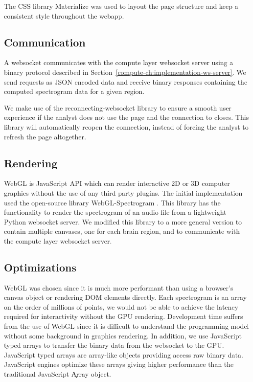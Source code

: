 The CSS library Materialize \cite{materialize} was used to layout the page
structure and keep a consistent style throughout the webapp.

\subsection{Communication}

A websocket communicates with the compute layer websocket server using a binary
protocol described in Section~\ref{compute-ch:implementation-ws-server}. We
send requests as JSON encoded data and receive binary responses containing the
computed spectrogram data for a given region.

We make use of the reconnecting-websocket \cite{reconnecting-websocket} library
to ensure a smooth user experience if the analyst does not use the page and the
connection to closes. This library will automatically reopen the connection,
instead of forcing the analyst to refresh the page altogether.

\subsection{Rendering}

WebGL is JavaScript API which can render interactive 2D or 3D computer graphics
without the use of any third party plugins. The initial implementation used the
open-source library WebGL-Spectrogram \cite{webgl-spectrogram}. This library
has the functionality to render the spectrogram of an audio file from a
lightweight Python websocket server. We modified this library to a more general
version to contain multiple canvases, one for each brain region, and to
communicate with the compute layer websocket server. \\

\subsection{Optimizations}

WebGL was chosen since it is much more performant than using a browser's canvas
object or rendering DOM elements directly. Each spectrogram is an array on the
order of millions of points, we would not be able to achieve the latency
required for interactivity without the GPU rendering. Development time suffers
from the use of WebGL since it is difficult to understand the programming model
without some background in graphics rendering. In addition, we use JavaScript
typed arrays to transfer the binary data from the websocket to the GPU.
JavaScript typed arrays are array-like objects providing access raw binary
data. JavaScript engines optimize these arrays giving higher performance than
the traditional JavaScript \c{Array} object.

